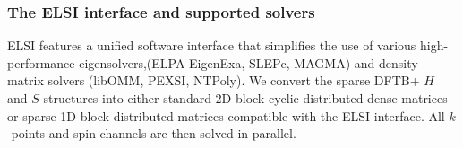 \documentclass[reprint,onecolumn,superscriptaddress]{revtex4-1}
\newcommand{\dftbp}{DFTB+}
\begin{document}
\subsubsection{The ELSI interface and supported solvers}
\label{sec:elsi}

ELSI\cite{elsi_yu_2018} features a unified software interface that simplifies
the use of various high-performance eigensolvers,(ELPA\cite{elpa_marek_2014}
EigenExa,\cite{eigenexa_imamura_2011} SLEPc,\cite{slepc_hernandez_2005}
MAGMA\cite{magma_dongarra_2014}) and density matrix solvers
(libOMM,\cite{libomm_corsetti_2014} PEXSI,\cite{pexsi_lin_2013}
NTPoly\cite{ntpoly_dawson_2018}). We convert the sparse \dftbp{} $H$ and $S$
structures\cite{aradi-jpca-2007} into either standard 2D block-cyclic
distributed dense matrices or sparse 1D block distributed matrices compatible
with the ELSI interface. All $k$-points and spin channels are then solved in
parallel.
\end{document}
